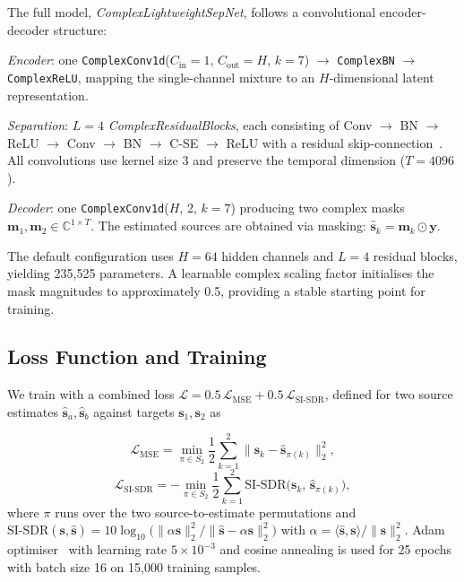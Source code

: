 \documentclass[twocolumn,english]{svjour3}
\begin{document}
The full model, \emph{ComplexLightweightSepNet}, follows a convolutional encoder-decoder structure:
\begin{compactitem}
\item \emph{Encoder}: one \texttt{ComplexConv1d}($C_{\text{in}}=1$, $C_{\text{out}}=H$, $k=7$) $\to$ \texttt{ComplexBN} $\to$ \texttt{ComplexReLU}, mapping the single-channel mixture to an $H$-dimensional latent representation.
\item \emph{Separation}: $L=4$ \emph{ComplexResidualBlocks}, each consisting of Conv $\to$ BN $\to$ ReLU $\to$ Conv $\to$ BN $\to$ C-SE $\to$ ReLU with a residual skip-connection~\cite{he2016resnet}. All convolutions use kernel size 3 and preserve the temporal dimension ($T=4096$).
\item \emph{Decoder}: one \texttt{ComplexConv1d}($H$, 2, $k=7$) producing two complex masks $\mathbf{m}_1, \mathbf{m}_2 \in \mathbb{C}^{1 \times T}$. The estimated sources are obtained via masking: $\hat{\mathbf{s}}_k = \mathbf{m}_k \odot \mathbf{y}$.
\end{compactitem}

The default configuration uses $H=64$ hidden channels and $L=4$ residual blocks, yielding 235{,}525 parameters. A learnable complex scaling factor initialises the mask magnitudes to approximately 0.5, providing a stable starting point for training.

\subsection{Loss Function and Training}

\begin{sloppypar}
We train with a combined loss $\mathcal{L} = 0.5\,\mathcal{L}_{\text{MSE}} + 0.5\,\mathcal{L}_{\text{SI-SDR}}$, defined for two source estimates $\hat{\mathbf{s}}_a, \hat{\mathbf{s}}_b$ against targets $\mathbf{s}_1, \mathbf{s}_2$ as
\end{sloppypar}
\begin{equation}
    \mathcal{L}_{\text{MSE}} = \min_{\pi \in S_2} \frac{1}{2}\sum_{k=1}^{2} \bigl\lVert \mathbf{s}_k - \hat{\mathbf{s}}_{\pi(k)} \bigr\rVert_2^2,
    \label{eq:mse}
\end{equation}
\begin{equation}
    \mathcal{L}_{\text{SI-SDR}} = -\min_{\pi \in S_2} \frac{1}{2}\sum_{k=1}^{2} \text{SI-SDR}\bigl(\mathbf{s}_k,\, \hat{\mathbf{s}}_{\pi(k)}\bigr),
    \label{eq:sisdr}
\end{equation}
where $\pi$ runs over the two source-to-estimate permutations and $\text{SI-SDR}(\mathbf{s}, \hat{\mathbf{s}}) = 10 \log_{10}\bigl(\lVert \alpha\mathbf{s}\rVert_2^2 / \lVert \hat{\mathbf{s}} - \alpha\mathbf{s}\rVert_2^2\bigr)$ with $\alpha = \langle \hat{\mathbf{s}}, \mathbf{s}\rangle / \lVert\mathbf{s}\rVert_2^2$. Adam optimiser~\cite{kingma2015adam} with learning rate $5\times 10^{-3}$ and cosine annealing is used for 25 epochs with batch size 16 on 15{,}000 training samples.
\end{document}
